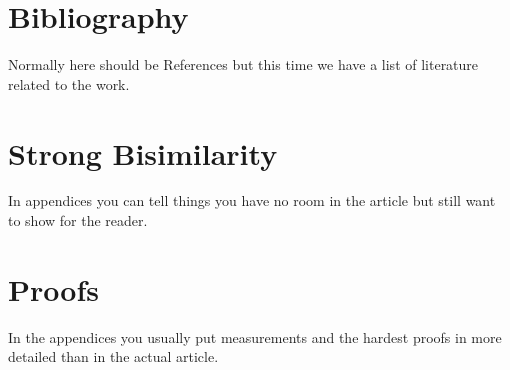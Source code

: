 \documentclass[a4paper,12pt]{article}
\begin{document}
\section*{Bibliography}
Normally here should be References but this time we have a list of literature related to the work.


\appendix
\section{Strong Bisimilarity}

In appendices you can tell things you have no room in the article but still want to show for the reader.

\section{Proofs}
In the appendices you usually put measurements and the hardest proofs in more detailed than in the actual article.
\end{document}
